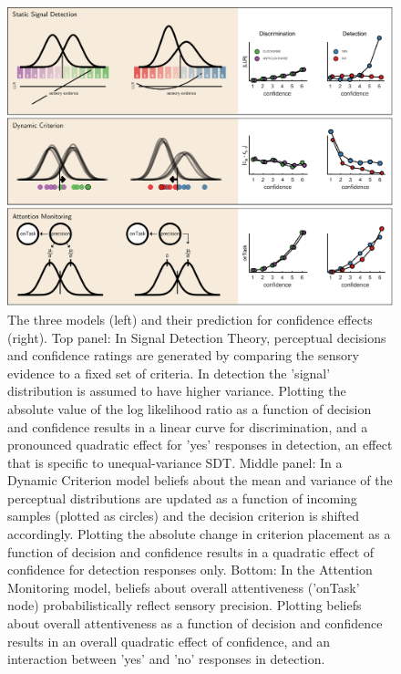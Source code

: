 \documentclass[12pt,twoside]{reedthesis}
\begin{document}
\begin{figure}
\includegraphics[width=\linewidth]{figure/fMRI/models} \caption[Computational models, imaging experiment]{The three models (left) and their prediction for confidence effects (right). Top panel: In Signal Detection Theory, perceptual decisions and confidence ratings are generated by comparing the sensory evidence to a fixed set of criteria. In detection the ’signal’ distribution is assumed to have higher variance. Plotting the absolute value of the log likelihood ratio as a function of decision and confidence results in a linear curve for discrimination, and a pronounced quadratic effect for 'yes' responses in detection, an effect that is specific to unequal-variance SDT. Middle panel: In a Dynamic Criterion model beliefs about the mean and variance of the perceptual distributions are updated as a function of incoming samples (plotted as circles) and the decision criterion is shifted accordingly. Plotting the absolute change in criterion placement as a function of decision and confidence results in a quadratic effect of confidence for detection responses only. Bottom: In the Attention Monitoring model, beliefs about overall attentiveness (’onTask’ node) probabilistically reflect sensory precision. Plotting beliefs about overall attentiveness as a function of decision and confidence results in an overall quadratic effect of confidence, and an interaction between 'yes' and 'no' responses in detection.}\label{fig:fMRI-exp1-models}
\end{figure}
\end{document}

